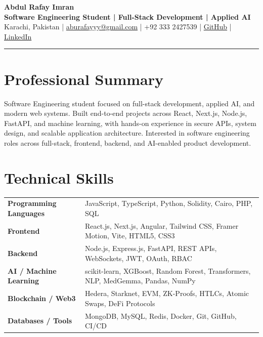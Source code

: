 \documentclass[10pt,a4paper]{article}
\newcommand{\headerline}[1]{\textcolor{muted}{#1}}
\newcommand{\roleline}[1]{{\large\color{accent}\bfseries #1}}
\begin{document}
\begingroup
{}

{\fontsize{24}{26}\selectfont\bfseries\color{ink} Abdul Rafay Imran} \\
\vspace{4pt}
\roleline{Software Engineering Student | Full-Stack Development | Applied AI} \\
\vspace{8pt}
\headerline{Karachi, Pakistan}
\hspace{0.8em}|\hspace{0.8em}
\href{mailto:aburafayyy@gmail.com}{aburafayyy@gmail.com}
\hspace{0.8em}|\hspace{0.8em}
+92 333 2427539
\hspace{0.8em}|\hspace{0.8em}
\href{https://github.com/RafayImraan}{GitHub}
\hspace{0.8em}|\hspace{0.8em}
\href{https://www.linkedin.com/in/abdul-rafay-imran-957b44276/}{LinkedIn}

\vspace{0.85em}
\color{line}\hrule
\vspace{0.9em}

\section*{Professional Summary}
\justifying
\color{ink}
Software Engineering student focused on full-stack development, applied AI, and modern web systems. Built end-to-end projects across React, Next.js, Node.js, FastAPI, and machine learning, with hands-on experience in secure APIs, system design, and scalable application architecture. Interested in software engineering roles across full-stack, frontend, backend, and AI-enabled product development.

\section*{Technical Skills}
\begin{tabularx}{\textwidth}{>{\bfseries\color{ink}}p{}X}
Programming Languages & JavaScript, TypeScript, Python, Solidity, Cairo, PHP, SQL \\
Frontend & React.js, Next.js, Angular, Tailwind CSS, Framer Motion, Vite, HTML5, CSS3 \\
Backend & Node.js, Express.js, FastAPI, REST APIs, WebSockets, JWT, OAuth, RBAC \\
AI / Machine Learning & scikit-learn, XGBoost, Random Forest, Transformers, NLP, MedGemma, Pandas, NumPy \\
Blockchain / Web3 & Hedera, Starknet, EVM, ZK-Proofs, HTLCs, Atomic Swaps, DeFi Protocols \\
Databases / Tools & MongoDB, MySQL, Redis, Docker, Git, GitHub, CI/CD \\
\end{tabularx}
\end{document}

